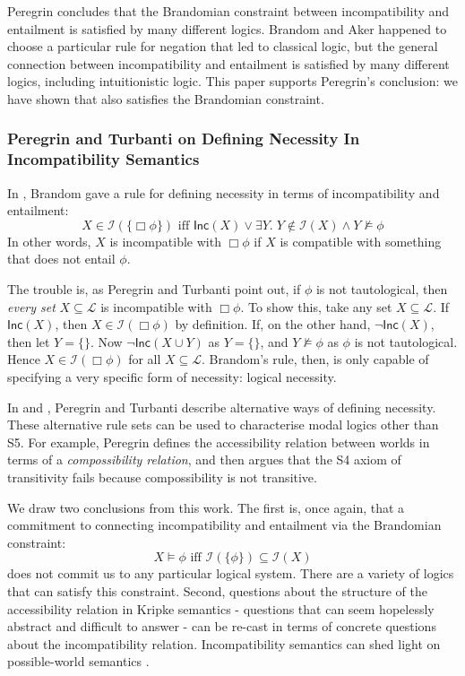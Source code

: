 Peregrin concludes that the Brandomian constraint between incompatibility and entailment is satisfied by many different logics. 
Brandom and Aker happened to choose a particular rule for negation that led to classical logic, but the general connection between incompatibility and entailment is satisfied by many different logics, including intuitionistic logic.
This paper supports Peregrin's conclusion: we have shown that \cathoristic{} also satisfies the Brandomian constraint.

\subsubsection{Peregrin and Turbanti on Defining Necessity In Incompatibility Semantics}\label{peregrin}

In \cite{brandom}, Brandom gave a rule for defining necessity in terms of incompatibility and entailment:
\[
X \in \mathcal{I}(\{\Box \phi\}) \text{ iff } \mathsf{Inc}(X) \lor \exists Y . \; Y \notin \mathcal{I}(X) \land Y \nvDash \phi
\]
In other words, $X$ is incompatible with $\Box \phi$ if $X$ is compatible with something that does not entail $\phi$.

The trouble is, as Peregrin and Turbanti point out, if $\phi$ is not tautological, then \emph{every set} $X \subseteq \mathcal{L}$ is incompatible with $\Box \phi$.
To show this, take any set $X \subseteq \mathcal{L}$. 
If $\mathsf{Inc}(X)$, then $X \in \mathcal{I}(\Box \phi)$ by definition.
If, on the other hand, $\neg \mathsf{Inc}(X)$, then let $Y = \{\}$.
Now $\neg \mathsf{Inc}(X \cup Y)$ as $Y = \{\}$, and $Y \nvDash \phi$ as $\phi$ is not tautological.
Hence $X \in \mathcal{I}(\Box \phi)$ for all $X \subseteq \mathcal{L}$. 
Brandom's rule, then, is only capable of specifying a very specific form of necessity: logical necessity.

In \cite{peregrine} and \cite{turbanti}, Peregrin and Turbanti describe alternative ways of defining necessity.
These alternative rule sets can be used to characterise modal logics other than S5.
For example, Peregrin defines the accessibility relation between worlds in terms of a \emph{compossibility relation}, and then argues that the S4 axiom of transitivity fails because compossibility is not transitive.

We draw two conclusions from this work.
The first is, once again, that a commitment to connecting incompatibility and entailment via the Brandomian constraint:
\[
X \models \phi \text{ iff } \mathcal{I}(\{\phi\}) \subseteq \mathcal{I}(X)
\]
does not commit us to any particular logical system. 
There are a variety of logics that can satisfy this constraint.
Second, questions about the structure of the accessibility relation in Kripke semantics - questions that can seem hopelessly abstract and difficult to answer - can be re-cast in terms of concrete questions about the incompatibility relation.
Incompatibility semantics can shed light on possible-world semantics \cite{turbanti}. 

